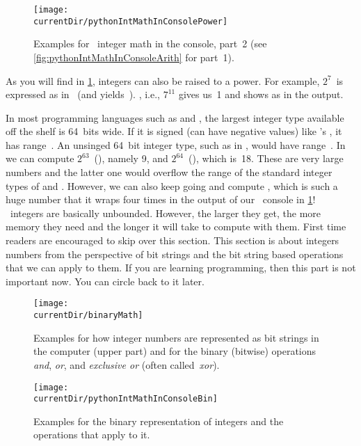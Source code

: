 \begin{figure}%
\centering%
\texttt{[image: \\currentDir/pythonIntMathInConsolePower]}%
\caption{Examples for \python\ integer math in the console, part~2 (see \cref{fig:pythonIntMathInConsoleArith} for part~1).}%
\label{fig:pythonIntMathInConsolePower}%
\end{figure}%

As you will find in \cref{fig:pythonIntMathInConsolePower}, integers can also be raised to a power.
For example, $2^7$~is expressed as  in \python\ (and yields~).
, i.e., $7^{11}$ gives us~1 and shows as  in the output.

In most programming languages such as  and , the largest integer type available off the shelf is 64~bits wide.
If it is signed (can have negative values) like 's , it has range~.
An unsinged 64~bit integer type, such as  in , would have range~.
In \python\, we can compute $2^{63}$~(), namely 9, and
$2^{64}$~(), which is~18.
These are very large numbers and the latter one would overflow the range of the standard integer types of  and .
However, we can also keep going and compute , which is such a huge number that it wraps four times in the output of our \python\ console in \cref{fig:pythonIntMathInConsolePower}!
\python\ integers are basically unbounded.
However, the larger they get, the more memory they need and the longer it will take to compute with them.
\endhsection%
%
%
%
First time readers are encouraged to skip over this section.
This section is about integers numbers from the perspective of bit strings and the bit string based operations that we can apply to them.
If you are learning programming, then this part is not important now.
You can circle back to it later.%
%
\begin{figure}%
\centering%
\texttt{[image: \\currentDir/binaryMath]}%
\caption{Examples for how integer numbers are represented as bit strings in the computer (upper part) and for the binary (bitwise) operations \emph{and}, \emph{or}, and \emph{exclusive or} (often called~\emph{xor}).}%
\label{fig:binaryMath}%
\end{figure}
\begin{figure}%
\centering%
\texttt{[image: \\currentDir/pythonIntMathInConsoleBin]}%
\caption{Examples for the binary representation of integers and the operations that apply to it.}%
\label{fig:pythonIntMathInConsoleBin}%
\end{figure}

